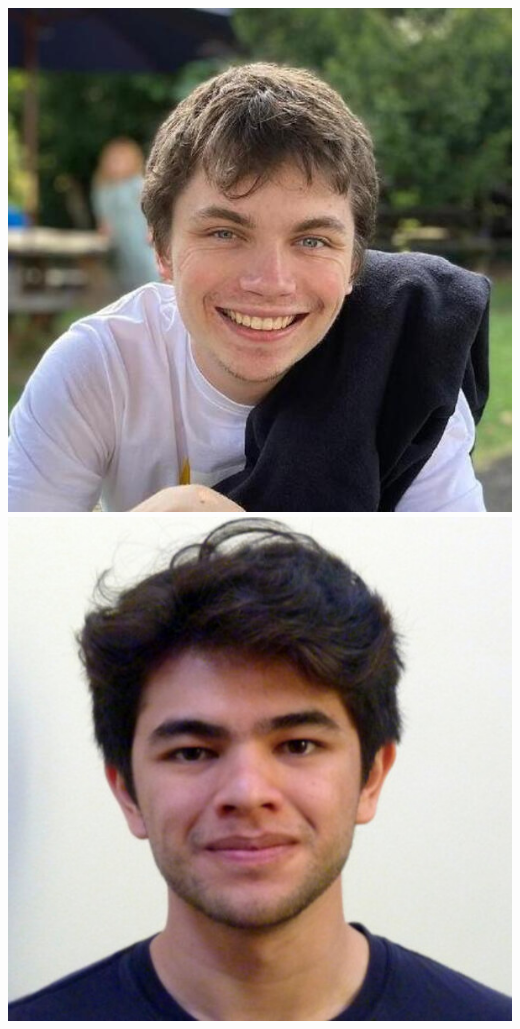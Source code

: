 \documentclass[aspectratio=169]{beamer}
\begin{document}
\begin{frame}
{        \includegraphics[width=0.09\textheight]{figures/students/harry_bevins.jpg}%
        \includegraphics[width=0.09\textheight]{figures/students/ian_roque.jpg}%
}
\end{frame}
\end{document}
